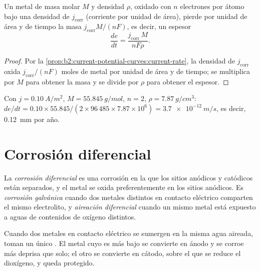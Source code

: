 \begin{proposition}\label{prop:b2:corrosion:rate}
Un metal de masa molar $M$ y densidad $\rho$, oxidado con $n$ electrones por
átomo bajo una densidad de  $j_{\text{corr}}$ (corriente por unidad de área),
pierde por unidad de área y de tiempo la masa $j_{\text{corr}}M/(nF)$, es decir, un
espesor
\[
  \frac{de}{dt} = \frac{j_{\text{corr}}\,M}{nF\rho} .
\]
\end{proposition}

\begin{proof}
Por la \cref{prop:b2:current-potential-curves:current-rate}, la densidad de  $j_{\text{corr}}$ oxida $j_{\text{corr}}/(nF)$ moles de metal por unidad de área y de
tiempo; se multiplica por $M$ para obtener la masa y se divide por $\rho$ para obtener el espesor.
\end{proof}

\begin{example}\label{ex:b2:corrosion:rate}
Con $j = \qty{0.10}{A/m^2}$, $M = \qty{55.845}{g/mol}$, $n = 2$, $\rho =
\qty{7.87}{g/cm^3}$: $de/dt = 0.10 \times 55.845/(2 \times 96\,485 \times 7.87
\times 10^6) = \qty{3.7e-12}{m/s}$, es decir, \qty{0.12}{mm} por año.
\end{example}

\section{Corrosión diferencial}

\begin{definition}\label{def:b2:corrosion:differential}
La \emph{corrosión diferencial} es una corrosión en
la que los sitios anódicos y catódicos están separados, y el metal se
oxida preferentemente en los sitios anódicos. Es \emph{corrosión
galvánica} cuando dos metales distintos en contacto
eléctrico comparten el mismo electrolito, y \emph{aireación
diferencial} cuando un mismo metal está expuesto a aguas de
contenidos de oxígeno distintos.
\end{definition}

\begin{proposition}\label{prop:b2:corrosion:galvanic}
Cuando dos metales en contacto eléctrico se sumergen en la misma agua aireada,
toman un único . El metal cuyo  es más bajo
se convierte en ánodo y se corroe más deprisa que solo; el otro se convierte en cátodo,
sobre el que se reduce el dioxígeno, y queda protegido.
\end{proposition}

